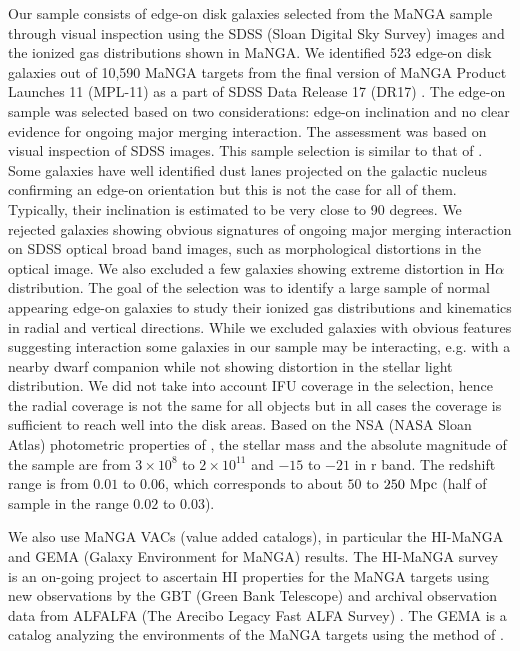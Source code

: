 \documentclass[fleqn,usenatbib]{mnras}
\begin{document}
Our sample consists of edge-on disk galaxies selected 
from the MaNGA sample through visual inspection 
using the SDSS (Sloan Digital Sky Survey) images and the ionized gas distributions shown in MaNGA.
We identified 523 edge-on disk galaxies out of 10,590 MaNGA targets 
from the final version of MaNGA Product Launches 11 (MPL-11) 
as a part of SDSS Data Release 17 (DR17) \citep{mangadr17}.
The edge-on sample was selected based on two considerations: edge-on inclination and 
no clear evidence for ongoing major merging interaction. The assessment was 
based on visual inspection of SDSS images.
This sample selection is similar to that of \citet{BWY17}.
Some  galaxies  have  well  identified  dust  lanes projected 
on  the  galactic  nucleus  confirming  an  edge-on orientation 
but this is not the case for all of them.
Typically, their inclination is estimated to be very close to 90 degrees. 
We rejected galaxies showing obvious signatures of 
ongoing major merging interaction on SDSS optical broad band images, 
such as morphological distortions in the optical image.
We also excluded a few galaxies showing extreme distortion in H$\alpha$
distribution. The goal of the selection was to identify a large sample of normal appearing edge-on galaxies to study their ionized gas distributions and kinematics in radial and vertical directions.
While we excluded galaxies with obvious features suggesting interaction
some galaxies in our sample may be interacting, e.g.
with a nearby dwarf companion while not showing distortion in the stellar light distribution.
We did not take into account IFU coverage in the selection, hence the radial coverage is not the same for all objects but in all cases the coverage is sufficient to reach well into the disk areas.
Based on the NSA (NASA Sloan Atlas) photometric properties of \citet{NSA}, 
the stellar mass and the absolute magnitude of the sample are
from $3\times10^{8}$ to $2\times10^{11}$ and $-15$ to $-21$ in r band.
The redshift range is from $0.01$ to $0.06$, 
which corresponds to about $50$ to $\rm 250~Mpc$
(half of sample in the range $0.02$ to $0.03$).

We also use MaNGA VACs (value added catalogs), in particular the HI-MaNGA and GEMA (Galaxy Environment for MaNGA) results.
The HI-MaNGA survey is an on-going project to ascertain HI properties 
for the MaNGA targets using new observations by the GBT (Green Bank Telescope) 
and archival observation data from ALFALFA (The Arecibo Legacy Fast ALFA Survey) \citep{Haynes2018,Masters2019,Goddy2020,Stark2021}.
The GEMA is a catalog analyzing the 
environments of the MaNGA targets using the method of \citet{Argudo2015}.
\end{document}

